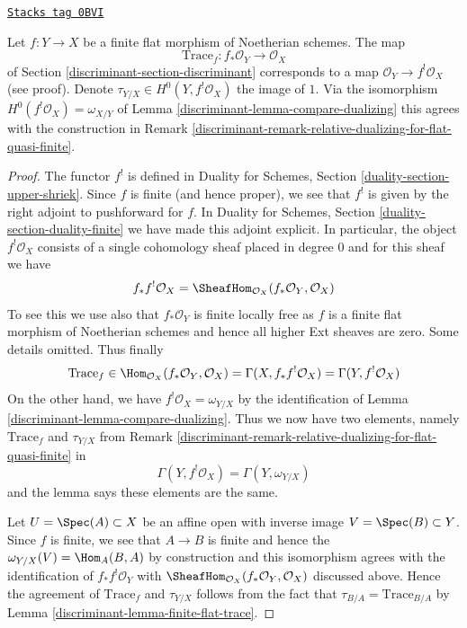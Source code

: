 \begin{lemma}
\label{discriminant-lemma-compare-trace}
\href{https://stacks.math.columbia.edu/tag/0BVI}{\texttt{Stacks tag 0BVI}}

Let $f : Y \to X$ be a finite flat morphism of Noetherian schemes.
The map
$$
\text{Trace}_f : f_*\mathcal{O}_Y \longrightarrow \mathcal{O}_X
$$
of Section \ref{discriminant-section-discriminant}
corresponds to a map $\mathcal{O}_Y \to f^!\mathcal{O}_X$ (see proof).
Denote $\tau_{Y/X} \in H^0(Y, f^!\mathcal{O}_X)$ the image of $1$.
Via the isomorphism $H^0(f^!\mathcal{O}_X) = \omega_{X/Y}$ of
Lemma \ref{discriminant-lemma-compare-dualizing}
this agrees with the construction in
Remark \ref{discriminant-remark-relative-dualizing-for-flat-quasi-finite}.
\end{lemma}

\begin{proof}

The functor $f^!$ is defined in
Duality for Schemes, Section \ref{duality-section-upper-shriek}.
Since $f$ is finite (and hence proper), we see that $f^!$ is given by
the right adjoint to pushforward for $f$. In
Duality for Schemes, Section \ref{duality-section-duality-finite}
we have made this adjoint explicit. In particular,
the object $f^!\mathcal{O}_X$ consists of a single
cohomology sheaf placed in degree $0$ and for this sheaf we have
$$
f_*f^!\mathcal{O}_X =
\SheafHom_{\mathcal{O}_X}(f_*\mathcal{O}_Y, \mathcal{O}_X)
$$
To see this we use also that $f_*\mathcal{O}_Y$ is finite locally free
as $f$ is a finite flat morphism of Noetherian schemes
and hence all higher Ext sheaves are zero. Some details omitted.
Thus finally
$$
\text{Trace}_f \in
\Hom_{\mathcal{O}_X}(f_*\mathcal{O}_Y, \mathcal{O}_X) =
\Gamma(X, f_*f^!\mathcal{O}_X) =
\Gamma(Y, f^!\mathcal{O}_X)
$$
On the other hand, we have $f^!\mathcal{O}_X = \omega_{Y/X}$
by the identification of Lemma \ref{discriminant-lemma-compare-dualizing}.
Thus we now have two elements, namely $\text{Trace}_f$
and $\tau_{Y/X}$ from
Remark \ref{discriminant-remark-relative-dualizing-for-flat-quasi-finite} in
$$
\Gamma(Y, f^!\mathcal{O}_X) = \Gamma(Y, \omega_{Y/X})
$$
and the lemma says these elements are the same.

\medskip\noindent
Let $U = \Spec(A) \subset X$ be an affine open with inverse image
$V = \Spec(B) \subset Y$. Since $f$ is finite, we see that
$A \to B$ is finite and hence the $\omega_{Y/X}(V) = \Hom_A(B,A)$
by construction and this isomorphism agrees with the identification
of $f_*f^!\mathcal{O}_Y$ with
$\SheafHom_{\mathcal{O}_X}(f_*\mathcal{O}_Y, \mathcal{O}_X)$ discussed
above. Hence the agreement of $\text{Trace}_f$ and $\tau_{Y/X}$
follows from the fact that $\tau_{B/A} = \text{Trace}_{B/A}$
by Lemma \ref{discriminant-lemma-finite-flat-trace}.
\end{proof}

